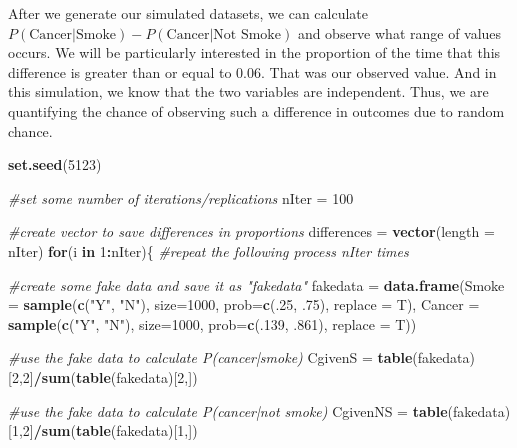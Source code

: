 \documentclass[openany]{book}
\newenvironment{Shaded}{\begin{snugshade}}{\end{snugshade}}
\newcommand{\CommentTok}[1]{\textcolor[rgb]{0.56,0.35,0.01}{\textit{#1}}}
\newcommand{\ControlFlowTok}[1]{\textcolor[rgb]{0.13,0.29,0.53}{\textbf{#1}}}
\newcommand{\DataTypeTok}[1]{\textcolor[rgb]{0.13,0.29,0.53}{#1}}
\newcommand{\DecValTok}[1]{\textcolor[rgb]{0.00,0.00,0.81}{#1}}
\newcommand{\FloatTok}[1]{\textcolor[rgb]{0.00,0.00,0.81}{#1}}
\newcommand{\KeywordTok}[1]{\textcolor[rgb]{0.13,0.29,0.53}{\textbf{#1}}}
\newcommand{\NormalTok}[1]{#1}
\newcommand{\OperatorTok}[1]{\textcolor[rgb]{0.81,0.36,0.00}{\textbf{#1}}}
\newcommand{\StringTok}[1]{\textcolor[rgb]{0.31,0.60,0.02}{#1}}
\begin{document}
After we generate our simulated datasets, we can calculate \(P(\text{Cancer}|\text{Smoke})-P(\text{Cancer}|\text{Not Smoke})\) and observe what range of values occurs. We will be particularly interested in the proportion of the time that this difference is greater than or equal to \(0.06\). That was our observed value. And in this simulation, we know that the two variables are independent. Thus, we are quantifying the chance of observing such a difference in outcomes due to random chance.

\begin{Shaded}
\begin{Highlighting}[]
\KeywordTok{set.seed}\NormalTok{(}\DecValTok{5123}\NormalTok{)}

\CommentTok{#set some number of iterations/replications}
\NormalTok{nIter =}\StringTok{ }\DecValTok{100}

\CommentTok{#create vector to save differences in proportions}
\NormalTok{differences =}\StringTok{ }\KeywordTok{vector}\NormalTok{(}\DataTypeTok{length =}\NormalTok{ nIter) }
\ControlFlowTok{for}\NormalTok{(i }\ControlFlowTok{in} \DecValTok{1}\OperatorTok{:}\NormalTok{nIter)\{ }\CommentTok{#repeat the following process nIter times}

  \CommentTok{#create some fake data and save it as "fakedata"}
\NormalTok{  fakedata =}\StringTok{ }\KeywordTok{data.frame}\NormalTok{(}\DataTypeTok{Smoke =} \KeywordTok{sample}\NormalTok{(}\KeywordTok{c}\NormalTok{(}\StringTok{"Y"}\NormalTok{, }\StringTok{"N"}\NormalTok{), }\DataTypeTok{size=}\DecValTok{1000}\NormalTok{, }
                                       \DataTypeTok{prob=}\KeywordTok{c}\NormalTok{(.}\DecValTok{25}\NormalTok{, }\FloatTok{.75}\NormalTok{), }\DataTypeTok{replace =}\NormalTok{ T),}
                        \DataTypeTok{Cancer =} \KeywordTok{sample}\NormalTok{(}\KeywordTok{c}\NormalTok{(}\StringTok{"Y"}\NormalTok{, }\StringTok{"N"}\NormalTok{), }\DataTypeTok{size=}\DecValTok{1000}\NormalTok{, }
                                        \DataTypeTok{prob=}\KeywordTok{c}\NormalTok{(.}\DecValTok{139}\NormalTok{, }\FloatTok{.861}\NormalTok{), }\DataTypeTok{replace =}\NormalTok{ T))}

  \CommentTok{#use the fake data to calculate P(cancer|smoke)}
\NormalTok{  CgivenS =}\StringTok{ }\KeywordTok{table}\NormalTok{(fakedata)[}\DecValTok{2}\NormalTok{,}\DecValTok{2}\NormalTok{]}\OperatorTok{/}\KeywordTok{sum}\NormalTok{(}\KeywordTok{table}\NormalTok{(fakedata)[}\DecValTok{2}\NormalTok{,])}

  \CommentTok{#use the fake data to calculate P(cancer|not smoke)}
\NormalTok{  CgivenNS =}\StringTok{ }\KeywordTok{table}\NormalTok{(fakedata)[}\DecValTok{1}\NormalTok{,}\DecValTok{2}\NormalTok{]}\OperatorTok{/}\KeywordTok{sum}\NormalTok{(}\KeywordTok{table}\NormalTok{(fakedata)[}\DecValTok{1}\NormalTok{,])}


\end{Highlighting}
\end{Shaded}
\end{document}
